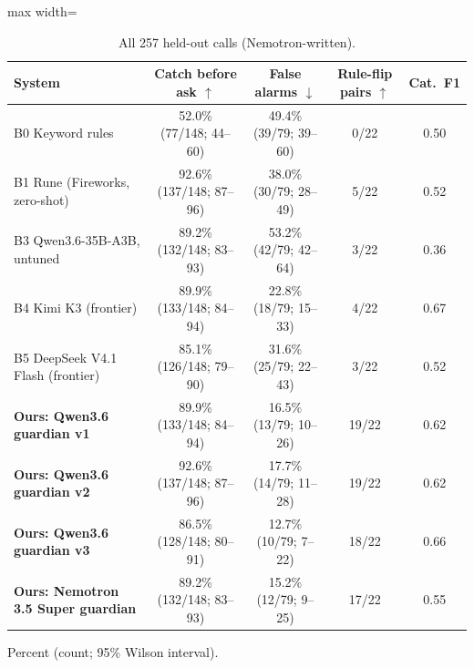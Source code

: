 \documentclass[11pt]{article}
\begin{document}
\begin{table}[H]\centering\small
\caption{All 257 held-out calls (Nemotron-written).}\label{tab:t257}
\begin{adjustbox}{max width=\linewidth}\begin{tabular}{lcccc}\toprule
System & Catch before ask $\uparrow$ & False alarms $\downarrow$ & Rule-flip pairs $\uparrow$ & Cat.\ F1 \\ \midrule
B0 Keyword rules & 52.0\% \scriptsize(77/148; 44--60) & 49.4\% \scriptsize(39/79; 39--60) & 0/22 & 0.50 \\
B1 Rune (Fireworks, zero-shot) & 92.6\% \scriptsize(137/148; 87--96) & 38.0\% \scriptsize(30/79; 28--49) & 5/22 & 0.52 \\
B3 Qwen3.6-35B-A3B, untuned & 89.2\% \scriptsize(132/148; 83--93) & 53.2\% \scriptsize(42/79; 42--64) & 3/22 & 0.36 \\
B4 Kimi K3 (frontier) & 89.9\% \scriptsize(133/148; 84--94) & 22.8\% \scriptsize(18/79; 15--33) & 4/22 & 0.67 \\
B5 DeepSeek V4.1 Flash (frontier) & 85.1\% \scriptsize(126/148; 79--90) & 31.6\% \scriptsize(25/79; 22--43) & 3/22 & 0.52 \\
\midrule
\textbf{Ours: Qwen3.6 guardian v1} & 89.9\% \scriptsize(133/148; 84--94) & 16.5\% \scriptsize(13/79; 10--26) & 19/22 & 0.62 \\
\textbf{Ours: Qwen3.6 guardian v2} & 92.6\% \scriptsize(137/148; 87--96) & 17.7\% \scriptsize(14/79; 11--28) & 19/22 & 0.62 \\
\textbf{Ours: Qwen3.6 guardian v3} & 86.5\% \scriptsize(128/148; 80--91) & 12.7\% \scriptsize(10/79; 7--22) & 18/22 & 0.66 \\
\textbf{Ours: Nemotron 3.5 Super guardian} & 89.2\% \scriptsize(132/148; 83--93) & 15.2\% \scriptsize(12/79; 9--25) & 17/22 & 0.55 \\
\bottomrule\end{tabular}\end{adjustbox}
\par\smallskip\footnotesize Percent (count; 95\% Wilson interval).
\end{table}
\end{document}
